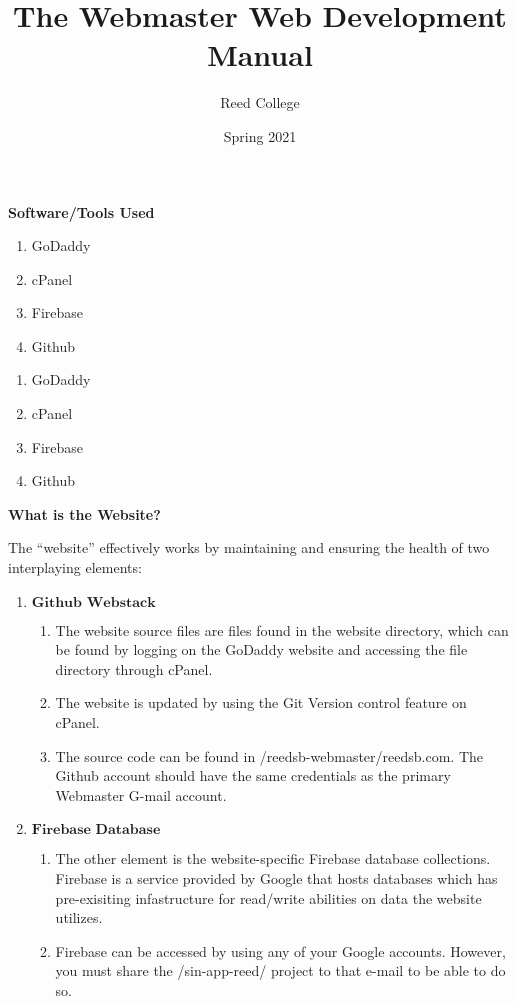 \documentclass[a4paper]{article}
\title{The Webmaster Web Development Manual}
\author{Reed College}
\date{Spring 2021}
\begin{document}
\maketitle

\begin{center}
\textbf{Software/Tools Used}
\end{center}

\begin{enumerate}
  \item GoDaddy
  \item cPanel
  \item Firebase
  \item Github
\end{enumerate}


\begin{enumerate}
  \item GoDaddy
  \item cPanel
  \item Firebase
  \item Github
\end{enumerate}

\begin{center}
\textbf{What is the Website?}
\end{center}
The ``website'' effectively works by maintaining and ensuring the health of two interplaying elements:

\begin{enumerate}
  \item $\textbf{Github Webstack}$
    \begin{enumerate}
      \item The website source files are files found in the website directory, which can be found by logging on the GoDaddy website and accessing the file directory through cPanel.
      \item The website is updated by using the Git Version control feature on cPanel.
      \item The source code can be found in /reedsb-webmaster/reedsb.com. The Github account should have the same credentials as the primary Webmaster G-mail account.
    \end{enumerate}
  \item $\textbf{Firebase Database}$
    \begin{enumerate}
      \item The other element is the website-specific Firebase database collections. Firebase is a service provided by Google that hosts databases which has pre-exisiting infastructure for read/write abilities on data the website utilizes.
      \item Firebase can be accessed by using any of your Google accounts. However, you must share the /sin-app-reed/ project to that e-mail to be able to do so.
    \end{enumerate}
\end{enumerate}
\end{document}
